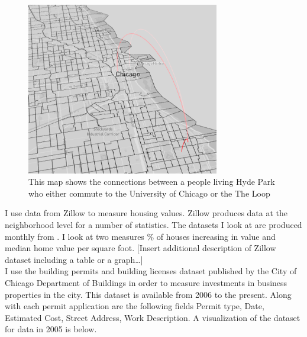 \documentclass{article}
\begin{document}
\begin{figure}[H]
    \centering
    \includegraphics[width=0.75\textwidth]{arc-2}
    \caption{This map shows the connections between a people living Hyde Park who either commute to the University of Chicago or the The Loop}
    \label{fig:arc-2}
\end{figure}

I use data from Zillow to measure housing values.  Zillow produces data at the neighborhood level for a number of statistics.  The datasets I look at are produced monthly from .  I look at two measures \% of houses increasing in value and median home value per square foot.
[Insert additional description of Zillow dataset including a table or a graph…]\\
I use the building permits and building licenses dataset published by the City of Chicago Department of Buildings in order to measure investments in business properties in the city.  This dataset is available from 2006 to the present.  Along with each permit application are the following fields Permit type, Date, Estimated Cost, Street Address, Work Description.  A visualization of the dataset for data in 2005 is below.
\end{document}
